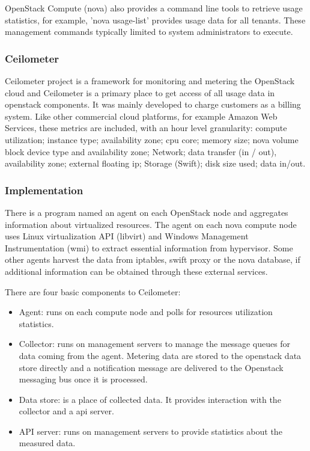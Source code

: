 \documentclass{sig-alternate-05-2015}
\begin{document}
OpenStack Compute (nova) also provides a command line tools to retrieve usage statistics, for example, 'nova usage-list' provides usage data for all tenants. These management commands typically limited to system administrators to execute.

\subsubsection{Ceilometer}

Ceilometer project is a framework for monitoring and metering the OpenStack cloud and Ceilometer is a primary place to get access of all usage data in openstack components. It was mainly developed to charge customers as a billing system. Like other commercial cloud platforms, for example Amazon Web Services, these metrics are included, with an hour level granularity:
  compute utilization;
   instance type;
   availability zone;
   cpu core;
   memory size;
   nova volume block device type and availability zone;
   Network;
   data transfer (in / out), availability zone;
   external floating ip;
   Storage (Swift);
   disk size used;
   data in/out.

\subsubsection{Implementation}

There is a program named an agent on each OpenStack node and aggregates information about virtualized resources. The agent on each nova compute node uses Linux virtualization API (libvirt) and Windows Management Instrumentation (wmi) to extract essential information from hypervisor. Some other agents harvest the data from iptables, swift proxy or the nova database, if additional information can be obtained through these external services.

There are four basic components to Ceilometer:

\begin{itemize}
  \item Agent: runs on each compute node and polls for resources utilization statistics.
  \item Collector: runs on management servers to manage the message queues for data coming from the agent. Metering data are stored to the openstack data store directly and a notification message are delivered to the Openstack messaging bus once it is processed.
  \item Data store: is a place of collected data. It provides interaction with the collector and a api server.
  \item API server: runs on management servers to provide statistics about the measured data.
\end{itemize}
\end{document}
